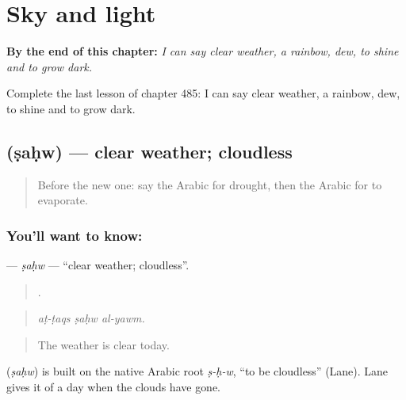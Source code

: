 
\chapter{Sky and light}
\label{ch:ar-sky-and-light}

\begin{chapteropening}
\textbf{By the end of this chapter:} \emph{I can say clear weather, a rainbow, dew, to shine and to grow dark.}

Complete the last lesson of chapter 485: I can say clear weather, a rainbow, dew, to shine and to grow dark.
\end{chapteropening}

\section[\texorpdfstring{\ar{صحو} (ṣaḥw)}{صحو (ṣaḥw)}]{ (ṣaḥw) — clear weather; cloudless}

\label{lesson:AR-C485-sahw}



\begin{quote}
Before the new one: say the Arabic for drought, then the Arabic for to evaporate.
\end{quote}

\subsection*{You'll want to know: }
\textbf{} — \emph{ṣaḥw} — \textquotedblleft{}clear weather; cloudless\textquotedblright{}.

\begin{quote}
  .
\end{quote}

\begin{quote}
\emph{aṭ-ṭaqs ṣaḥw al-yawm.}
\end{quote}

\begin{quote}
The weather is clear today.
\end{quote}

\begin{cousinweb}
\textbf{} (\emph{ṣaḥw}) is built on the native Arabic root \emph{ṣ-ḥ-w}, \textquotedblleft{}to be cloudless\textquotedblright{} (Lane). Lane gives it of a day when the clouds have gone.
\end{cousinweb}

